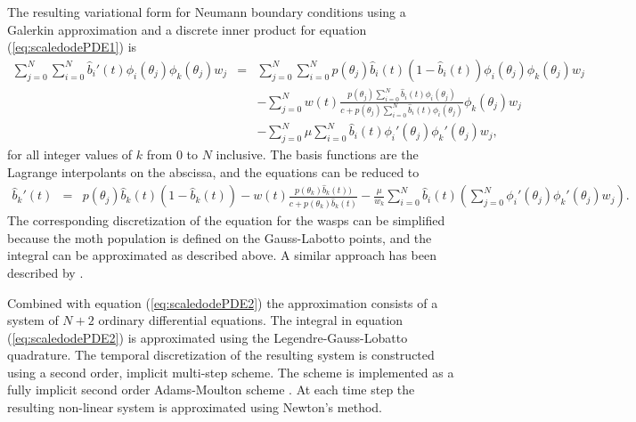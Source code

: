 \documentclass[review,authoryear]{elsarticle}
\begin{document}
The resulting variational form for Neumann boundary conditions using a
Galerkin approximation and a discrete inner product for equation
(\ref{eq:scaledodePDE1}) is
\begin{eqnarray}
  \sum_{j=0}^N \sum_{i=0}^N  \hat{b}_i'(t) \phi_i(\theta_j) \phi_k(\theta_j) w_j
  & = &
  \sum_{j=0}^N \sum_{i=0}^N p(\theta_j)  \hat{b}_i(t) (1 - \hat{b}_i(t) ) \phi_i(\theta_j) \phi_k(\theta_j) w_j \\
  & &  -  \sum_{j=0}^N w(t) \frac{p(\theta_j) \sum_{i=0}^N \hat{b}_i(t) \phi_i(\theta_j) }{c+p(\theta_j) \sum_{i=0}^N \hat{b}_i(t) \phi_i(\theta_j)} \phi_k(\theta_j) w_j \nonumber \\ 
  & & - \sum_{j=0}^N \mu  \sum_{i=0}^N \hat{b}_i(t) \phi_i'(\theta_j) \phi_k'(\theta_j)  w_j, \nonumber
\end{eqnarray}
for all integer values of $k$ from $0$ to $N$ inclusive.  The basis
functions are the Lagrange interpolants on the abscissa, and the
equations can be reduced to
\begin{eqnarray}
  \hat{b}_k'(t) 
  & = &
        p(\theta_j) \hat{b}_k(t) (1 - \hat{b}_k(t) )
        -  w(t) \frac{p(\theta_k) \hat{b}_k(t)) }{c+p(\theta_k)  \hat{b}_k(t) }  
   - \frac{\mu}{w_k} \sum_{i=0}^N \hat{b}_i(t) \left( \sum_{j=0}^N  \phi_i'(\theta_j) \phi_k'(\theta_j)  w_j \right).
\end{eqnarray}
The corresponding discretization of the equation for the wasps can be simplified because the moth population is defined on the Gauss-Labotto points, and the integral can be approximated as described above. A similar approach has been described by \cite{doi:10.1002/mma.1318}.

Combined with equation (\ref{eq:scaledodePDE2}) the approximation
consists of a system of $N+2$ ordinary differential equations. The
integral in equation (\ref{eq:scaledodePDE2}) is approximated using
the Legendre-Gauss-Lobatto quadrature. The temporal discretization of
the resulting system is constructed using a second order, implicit
multi-step scheme. The scheme is implemented as a fully implicit
second order Adams-Moulton scheme \citep{ascher2011first}. At each time
step the resulting non-linear system is approximated using Newton's
method.



\clearpage
%


\end{document}
